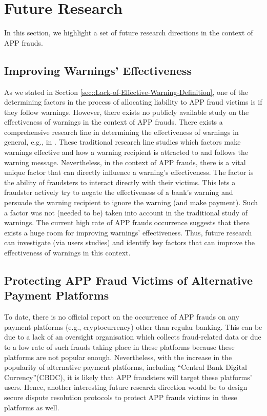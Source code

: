 

\section{Future Research}\label{sec::Future-Research}


In this section, we highlight a set of future research directions in the context of APP frauds. 

\subsection{Improving Warnings' Effectiveness}

As we stated in  Section \ref{sec::Lack-of-Effective-Warning-Definition},  one of the determining factors in the process of allocating liability to APP fraud victims is if they follow warnings. However,  there exists no publicly available study on the effectiveness of warnings in  the context of APP frauds. There exists a comprehensive research line in determining the effectiveness of warnings in general, e.g., in \cite{brinton2016users,felt2014experimenting,laughery2006designing}. These traditional research line studies which factors make warnings effective and how a warning recipient is attracted to and follows the warning message. Nevertheless, in the context of APP frauds, there is a vital unique factor that can directly influence a warning's effectiveness. The factor is the ability of  fraudsters to interact directly with their victims. This lets a fraudster  actively try to negate the effectiveness of a bank's warning and persuade the warning recipient to ignore the warning (and make payment). Such a factor was not (needed to be) taken into account in the traditional study of warnings. The current high rate of  APP frauds occurrence suggests that there exists a huge room for improving warnings' effectiveness. Thus, future research can investigate (via  users studies) and identify  key factors that can improve the effectiveness of warnings in this context. 


\subsection{Protecting APP Fraud Victims of Alternative Payment Platforms}

To date, there is no official report on the occurrence of APP frauds on any  payment platforms (e.g., cryptocurrency) other than  regular banking. This can be due to a lack of an oversight organisation which  collects fraud-related data or due to a low rate of such frauds taking place in these platforms because these platforms are not popular enough. Nevertheless,  with the increase in the popularity of alternative payment platforms, including ``Central Bank Digital Currency''(CBDC), it is likely that APP fraudsters will target these platforms' users. Hence, another interesting future research direction would be to design secure dispute resolution protocols  to protect  APP frauds victims in these platforms as well. 

